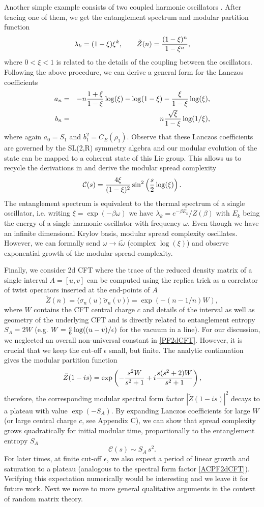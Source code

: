 \documentclass[aps,prl,twocolumn,showpacs,preprintnumbers,amsmath,amssymb]{revtex4-1}
\def\frac#1#2{{#1\over #2}}
\def\be{\begin{equation}}
\def\ee{\end{equation}}
\newcommand{\bea}{\begin{eqnarray}}
\newcommand{\eea}{\end{eqnarray}}
\begin{document}
Another simple example consists of two coupled harmonic oscillators \cite{Srednicki:1993im}. After tracing one of them, we get the entanglement spectrum and modular partition function
\be
\lambda_k=(1-\xi)\xi^k,\qquad\tilde{Z}(n)=\frac{(1-\xi)^n}{1-\xi^n},
\ee
where $0<\xi<1$ is related to the details of the coupling between the oscillators. Following the above procedure, we can  derive a general form for the Lanczos coefficients
\bea
a_n&=&-n\frac{1+\xi}{1-\xi}\log(\xi)-\log(1-\xi)-\frac{\xi}{1-\xi}\log(\xi),\nonumber\\
b_n&=&n\frac{\sqrt{\xi}}{1-\xi}\log(1/\xi),
\eea
where again $a_0=S_1$ and $b^2_1=C_E(\rho_1)$. Observe that these Lanczos coefficients are governed by the SL(2,R) symmetry algebra and our modular evolution of the state can be mapped to a coherent state of this Lie group. This allows us to recycle the derivations in \cite{Caputa:2021sib} and derive the modular spread complexity
\be
\mathcal{C}(s)=\frac{4\xi}{(1-\xi)^2}\sin^2\left(\frac{s}{2}\log(\xi)\right).
\ee
The entanglement spectrum is equivalent to the thermal spectrum of a single oscillator, i.e. writing $\xi=\exp(-\beta \omega)$ we have $\lambda_k=e^{-\beta E_k}/Z(\beta)$ with $E_k$ being the energy of a single harmonic oscillator with frequency $\omega$. Even though we have an infinite dimensional Krylov basis, modular spread complexity oscillates. However, we can formally send $\omega\to i \tilde{\omega}$ (complex $\log(\xi)$) and observe exponential growth of the modular spread complexity.

Finally, we consider 2d CFT where the trace of the reduced density matrix of a single interval $A=[u,v]$ can be computed using the replica trick as a correlator of twist operators inserted at the end-points of $A$ \cite{Calabrese:2004eu}
\be
\tilde{Z}(n)=\langle\sigma_n(u)\tilde{\sigma}_n(v)\rangle=\exp(-\left(n-1/n\right)W),\label{PF2dCFT}
\ee
where $W$ contains the CFT central charge $c$ and details of the interval as well as geometry of the underlying CFT and is directly related to entanglement entropy $S_A=2W$ (e.g. $W=\frac{c}{6}\log((u-v)/\epsilon)$ for the vacuum in a line). For our discussion, we neglected an overall non-universal constant in \eqref{PF2dCFT}. However, it is crucial that we keep the cut-off $\epsilon$ small, but finite. The analytic continuation gives the modular partition function
\be
\tilde{Z}(1-is)=\exp\left(-\frac{s^2W}{s^2+1}+i\frac{s(s^2+2)W}{s^2+1}\right),\label{ACPF2dCFT}
\ee
therefore, the corresponding modular spectral form factor $|\tilde{Z}(1-is)|^2$ decays to a plateau with value $\exp(-S_A)$. 
By expanding Lanczos coefficients for large $W$ (or large central charge $c$, see Appendix C), we can show that spread complexity grows quadratically for initial modular time, proportionally to the entanglement entropy $S_A$
\be
\mathcal{C}(s)\sim S_A\, s^2.
\ee
For later times, at finite cut-off $\epsilon$, we also expect a period of linear growth and saturation to a plateau (analogous to the spectral form factor \eqref{ACPF2dCFT}).  Verifying this expectation numerically would be interesting and we leave it for future work. Next we move to more general qualitative arguments in the context of random matrix theory.
\end{document}
